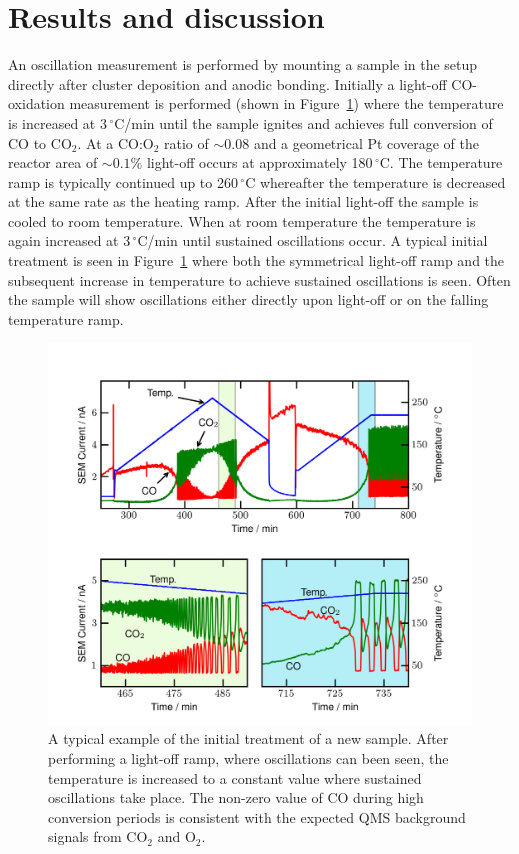 \documentclass[journal=jacsat,manuscript=article]{achemso}
\begin{document}
\section{Results and discussion}
An oscillation measurement is performed by mounting a sample in the setup
directly after cluster deposition and anodic bonding. Initially a light-off
CO-oxidation measurement is performed (shown in Figure~\ref{fgr:initial_treatment}) where
the temperature is increased at 3\,$^\circ$C/min until the sample ignites and
achieves full conversion of CO to CO$_2$. At a CO:O$_2$ ratio of $\sim0.08$ and a
geometrical Pt coverage of the reactor area of $\sim0.1\%$ light-off occurs at approximately
180\,$^\circ$C. The temperature ramp is typically continued up to
260\,$^\circ$C whereafter the temperature is decreased at the same rate as the
heating ramp. After the initial light-off the sample is cooled to room
temperature. When at room temperature the temperature is again increased at
3\,$^\circ$C/min until sustained oscillations occur. A typical initial
treatment is seen in Figure~\ref{fgr:initial_treatment} where both the symmetrical
light-off ramp and the subsequent increase in temperature to achieve sustained
oscillations is seen. Often the sample will show oscillations either directly
upon light-off or on the falling temperature ramp.

\begin{figure}
  \includegraphics[width=12cm]{initial_treatment.png} 
  \caption{A typical example of the initial treatment of a new sample. After
  performing a light-off ramp, where oscillations can been seen, the temperature
  is increased to a constant value where sustained oscillations take place. The
  non-zero value of CO during high conversion periods is consistent with the
  expected QMS background signals from CO$_2$ and O$_2$.}
  \label{fgr:initial_treatment}
\end{figure}
\end{document}
